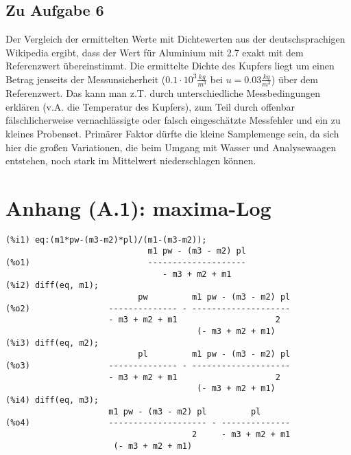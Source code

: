 \documentclass[12pt,a4paper,notitlepage]{article}
\begin{document}
\subsection{Zu Aufgabe 6}
Der Vergleich der ermittelten Werte mit Dichtewerten aus der deutschsprachigen Wikipedia ergibt, dass der Wert für Aluminium mit 2.7 exakt mit dem Referenzwert übereinstimmt. Die ermittelte Dichte des Kupfers liegt um einen Betrag jenseits der Messunsicherheit ($0.1\cdot 10^3\frac{kg}{m^3}$ bei $u=0.03\frac{kg}{m^3}$) über dem Referenzwert. Das kann man z.T. durch unterschiedliche Messbedingungen erklären (v.A. die Temperatur des Kupfers), zum Teil durch offenbar fälschlicherweise vernachlässigte oder falsch eingeschätzte Messfehler und ein zu kleines Probenset. Primärer Faktor dürfte die kleine Samplemenge sein, da sich hier die großen Variationen, die beim Umgang mit Wasser und Analysewaagen entstehen, noch stark im Mittelwert niederschlagen können.

\section*{Anhang (A.1): maxima-Log}
\begin{verbatim}
(%i1) eq:(m1*pw-(m3-m2)*pl)/(m1-(m3-m2));
                             m1 pw - (m3 - m2) pl
(%o1)                        --------------------
                                - m3 + m2 + m1
(%i2) diff(eq, m1);
                           pw         m1 pw - (m3 - m2) pl
(%o2)                -------------- - --------------------
                     - m3 + m2 + m1                    2
                                       (- m3 + m2 + m1)
(%i3) diff(eq, m2);
                           pl         m1 pw - (m3 - m2) pl
(%o3)                -------------- - --------------------
                     - m3 + m2 + m1                    2
                                       (- m3 + m2 + m1)
(%i4) diff(eq, m3);
                     m1 pw - (m3 - m2) pl         pl
(%o4)                -------------------- - --------------
                                      2     - m3 + m2 + m1
                      (- m3 + m2 + m1)
\end{verbatim}
\end{document}
